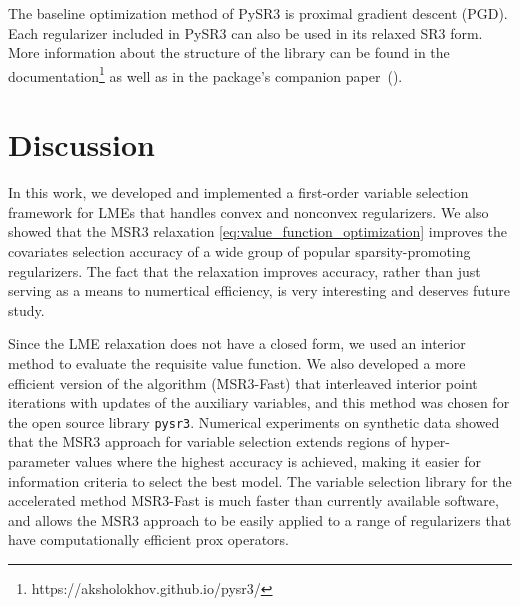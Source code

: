 The baseline optimization method of PySR3 is proximal gradient descent (PGD). Each regularizer included in PySR3 can also be used in its relaxed SR3 form. More information about the structure of the library can be found in the documentation\footnote{https://aksholokhov.github.io/pysr3/} as well as in the package's companion paper~(\cite{sholokhov2023pysr3}).

\section{Discussion}
\label{sec:discussion}

    In this work, we developed and implemented a first-order variable selection framework for LMEs that handles convex and nonconvex regularizers. We also showed that 
    the MSR3 relaxation \eqref{eq:value_function_optimization} 
improves the covariates selection accuracy of a wide group of popular sparsity-promoting regularizers. The fact that the relaxation improves accuracy, rather than just serving as a means to {numertical efficiency, %
     is very interesting and deserves future study.} %
    
    Since the LME relaxation does not have a closed form, we used an interior method to evaluate the requisite value function. We also developed 
    a more efficient version of the algorithm  (MSR3-Fast) that interleaved interior point iterations with updates of the auxiliary variables, and this method was chosen for the 
    open source library \texttt{pysr3}. %
{ Numerical experiments on synthetic data showed that the MSR3 approach for variable selection extends regions of hyper-parameter values where the highest accuracy is achieved, making it easier for information criteria to select the best model.} 
 The variable selection library for the accelerated method MSR3-Fast is much faster than currently available software, and allows the MSR3 approach to be easily applied to a range of regularizers that have 
{computationally efficient prox operators.} %

